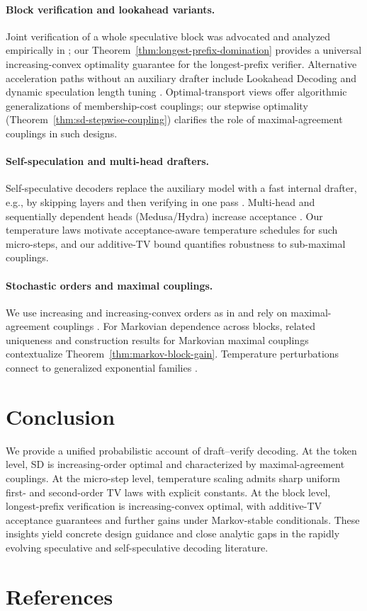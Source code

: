 \documentclass[11pt]{article}
\numberwithin{equation}{section}
\theoremstyle{plain}
\theoremstyle{definition}
\theoremstyle{remark}
\begin{document}
\paragraph{Block verification and lookahead variants.} Joint verification of a whole speculative block was advocated and analyzed empirically in \cite{Sun2024BlockVerification}; our Theorem~\ref{thm:longest-prefix-domination} provides a universal increasing-convex optimality guarantee for the longest-prefix verifier. Alternative acceleration paths without an auxiliary drafter include Lookahead Decoding \cite{Fu2024Lookahead} and dynamic speculation length tuning \cite{Mamou2024DISCO}. Optimal-transport views \cite{Sun2023SpecTr} offer algorithmic generalizations of membership-cost couplings; our stepwise optimality (Theorem~\ref{thm:sd-stepwise-coupling}) clarifies the role of maximal-agreement couplings in such designs.

\paragraph{Self-speculation and multi-head drafters.} Self-speculative decoders replace the auxiliary model with a fast internal drafter, e.g., by skipping layers and then verifying in one pass \cite{DraftVerifyACL2024}. Multi-head and sequentially dependent heads (Medusa/Hydra) increase acceptance \cite{Ankner2024Hydra}. Our temperature laws motivate acceptance-aware temperature schedules for such micro-steps, and our additive-TV bound quantifies robustness to sub-maximal couplings.

\paragraph{Stochastic orders and maximal couplings.} We use increasing and increasing-convex orders as in \cite{ShakedShanthikumar2007StochasticOrders} and rely on maximal-agreement couplings \cite{Lindvall2002CouplingMethod}. For Markovian dependence across blocks, related uniqueness and construction results for Markovian maximal couplings \cite{BanerjeeKendall2016Rigidity,Boettcher2017MMC} contextualize Theorem~\ref{thm:markov-block-gain}. Temperature perturbations connect to generalized exponential families \cite{Naudts2009QExponentialFamily}.

\section{Conclusion}
We provide a unified probabilistic account of draft--verify decoding. At the token level, SD is increasing-order optimal and characterized by maximal-agreement couplings. At the micro-step level, temperature scaling admits sharp uniform first- and second-order TV laws with explicit constants. At the block level, longest-prefix verification is increasing-convex optimal, with additive-TV acceptance guarantees and further gains under Markov-stable conditionals. These insights yield concrete design guidance and close analytic gaps in the rapidly evolving speculative and self-speculative decoding literature.

\section*{References}

\end{document}
